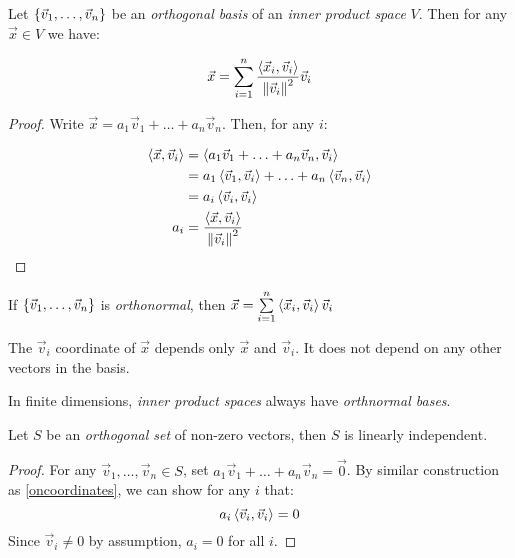 \begin{theorem}\label{oncoordinates}
  Let $\left\{\vec v_1, \ldots, \vec v_n\right\}$ be an \emph{orthogonal basis} of an \emph{inner product space} $V$.
  Then for any $\vec x \in V$ we have:

  $$\vec x = \sum_{i=1}^n \frac{\left\langle \vec x_i , \vec v_i \right\rangle}{\left\lVert\vec v_i\right\rVert^2} \vec v_i$$
\end{theorem}
\begin{proof}
  Write $\vec x = a_1\vec v_1 + \ldots + a_n \vec v_n$. Then, for any $i$:

  \begin{align}
    \left\langle \vec x , \vec v_i \right\rangle &= \left\langle a_1 \vec v_1 + \ldots + a_n \vec v_n , \vec v_i \right\rangle \\
                           &= a_1\left\langle \vec v_1 , \vec v_i \right\rangle + \ldots + a_n \left\langle \vec v_n , \vec v_i \right\rangle \\
                           &= a_i \left\langle \vec v_i , \vec v_i \right\rangle \\
                       a_i &= \frac{\left\langle \vec x , \vec v_i \right\rangle}{\left\lVert\vec v_i\right\rVert^2}
  \end{align}
\end{proof}
\begin{remark}
  If $\left\{\vec v_1, \ldots, \vec v_n\right\}$ is \emph{orthonormal}, then $\vec x = \sum\limits_{i=1}^n \left\langle \vec x_i , \vec v_i \right\rangle \vec v_i$
\end{remark}
\begin{remark}
  The $\vec v_i$ coordinate of $\vec x$ depends only $\vec x$ and $\vec v_i$. It does not depend on any other vectors in the basis.
\end{remark}
\begin{remark}
  In finite dimensions, \emph{inner product spaces} always have \emph{orthnormal bases}.
\end{remark}

\begin{theorem}\label{orthindep}
  Let $S$ be an \emph{orthogonal set} of non-zero vectors, then $S$ is linearly independent.
\end{theorem}
\begin{proof}
  For any $\vec v_1, \ldots, \vec v_n \in S$, set $a_1\vec v_1 + \ldots + a_n\vec v_n = \vec 0$.
  By similar construction as \ref{oncoordinates}, we can show for any $i$ that:
  $$a_i\left\langle \vec v_i , \vec v_i \right\rangle = 0$$
  Since $\vec v_i \ne 0$ by assumption, $a_i = 0$ for all $i$.
\end{proof}

